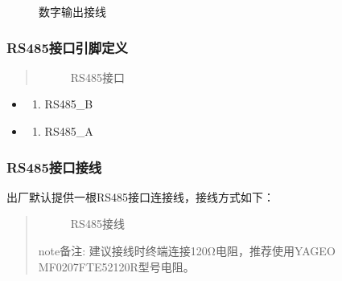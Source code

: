 \documentclass[a4paper,11pt,english,openany,oneside]{sphinxmanual}
\begin{document}
\begin{figure}[H]
\centering
\capstart

\noindent{}
\caption{数字输出接线}\label{\detokenize{08 _u5b89_u88c5_u4e0e_u8c03_u8bd5:id61}}\end{figure}


\subsubsection{RS485接口引脚定义}
\label{\detokenize{08 _u5b89_u88c5_u4e0e_u8c03_u8bd5:rs485}}\label{\detokenize{08 _u5b89_u88c5_u4e0e_u8c03_u8bd5:id34}}\begin{quote}

\begin{figure}[H]
\centering
\capstart

\noindent{}
\caption{RS485接口}\label{\detokenize{08 _u5b89_u88c5_u4e0e_u8c03_u8bd5:id62}}\end{figure}
\end{quote}
\begin{itemize}
\item {} \begin{enumerate}
%
\item {} 
\sphinxAtStartPar
RS485\_B

\end{enumerate}

\item {} \begin{enumerate}
%
\setcounter{enumi}{1}
\item {} 
\sphinxAtStartPar
RS485\_A

\end{enumerate}

\end{itemize}


\subsubsection{RS485接口接线}
\label{\detokenize{08 _u5b89_u88c5_u4e0e_u8c03_u8bd5:id35}}\label{\detokenize{08 _u5b89_u88c5_u4e0e_u8c03_u8bd5:id36}}
\sphinxAtStartPar
出厂默认提供一根RS485接口连接线，接线方式如下：
\begin{quote}

\begin{figure}[H]
\centering
\capstart

\noindent{}
\caption{RS485接线}\label{\detokenize{08 _u5b89_u88c5_u4e0e_u8c03_u8bd5:id63}}\end{figure}

\begin{sphinxadmonition}{note}{备注:}
\sphinxAtStartPar
建议接线时终端连接120Ω电阻，推荐使用YAGEO MF0207FTE52\sphinxhyphen{}120R型号电阻。
\end{sphinxadmonition}
\end{quote}
\end{document}
